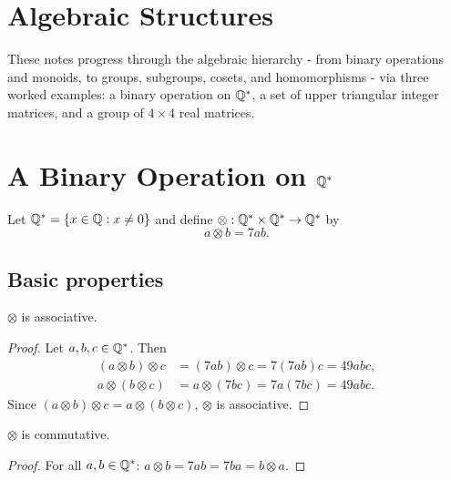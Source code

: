 \section{Algebraic Structures}

These notes progress through the algebraic hierarchy - from binary operations
and monoids, to groups, subgroups, cosets, and homomorphisms - via three
worked examples: a binary operation on $\mathbb{Q}^{*}$, a set of upper triangular
integer matrices, and a group of $4 \times 4$ real matrices.

\section{A Binary Operation on \texorpdfstring{$\mathbb{Q}^{*}$}{Q*}}

Let $\mathbb{Q}^{*} = \{x \in \mathbb{Q} : x \neq 0\}$ and define $\otimes : \mathbb{Q}^{*} \times \mathbb{Q}^{*}
\to \mathbb{Q}^{*}$ by
\[
    a \otimes b = 7ab.
\]

\subsection{Basic properties}

\begin{proposition}
$\otimes$ is associative.
\end{proposition}
\begin{proof}
Let $a, b, c \in \mathbb{Q}^{*}$. Then
\begin{align*}
    (a \otimes b) \otimes c
    &= (7ab) \otimes c = 7(7ab)c = 49abc, \\
    a \otimes (b \otimes c)
    &= a \otimes (7bc) = 7a(7bc) = 49abc.
\end{align*}
Since $(a \otimes b) \otimes c = a \otimes (b \otimes c)$, $\otimes$ is associative.
\end{proof}

\begin{proposition}
$\otimes$ is commutative.
\end{proposition}
\begin{proof}
For all $a, b \in \mathbb{Q}^{*}$: $a \otimes b = 7ab = 7ba = b \otimes a$.
\end{proof}

